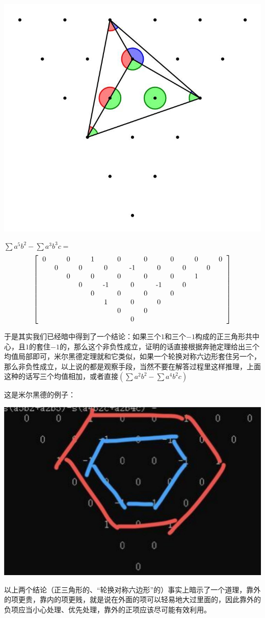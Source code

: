 \documentclass[UTF8]{ctexart}
\begin{document}
\begin{center}
	\includegraphics[width=0.4\linewidth]{140}
\end{center}

$ \displaystyle  \sum a^{5}b^{2}-\displaystyle  \sum a^{3}b^{3}c= $
\renewcommand*{\arraystretch}{1.732}\[\left[\begin{matrix}
	\begin{tabular}{ccccccccccccccc}
		0& &0& &1& &0& &0& &0& &0& &0\\
		&0& &0& &0& &-1& &0& &0& &0&\\
		& &0& &0& &0& &0& &0& &1& &\\
		& & &0& &-1& &0& &-1& &0& & &\\
		& & & &0& &0& &0& &0& & & &\\
		& & & & &1& &0& &0& & & & &\\
		& & & & & &0& &0& & & & & &\\
		& & & & & & &0& & & & & & &\\
	\end{tabular}
\end{matrix}\right]\]


于是其实我们已经暗中得到了一个结论：如果三个$ 1 $和三个$ -1 $构成的正三角形共中心，且$ 1 $的套住$ -1 $的，那么这个非负性成立，证明的话直接根据奔驰定理给出三个均值局部即可，米尔黑德定理就和它类似，如果一个轮换对称六边形套住另一个，那么非负性成立，以上说的都是观察手段，当然不要在解答过程里这样推理，上面这种的话写三个均值相加，或者直接$ (\displaystyle \sum a^{2}b^{2}-\displaystyle \sum a^{4}b^{2}c) $

这是米尔黑德的例子：
\begin{center}
	\includegraphics[width=0.45\linewidth]{160}
\end{center}
以上两个结论（正三角形的、“轮换对称六边形”的）事实上暗示了一个道理，靠外的项更贵，靠内的项更贱，就是说在外面的项可以轻易地大过里面的，因此靠外的负项应当小心处理、优先处理，靠外的正项应该尽可能有效利用。\\
\end{document}
